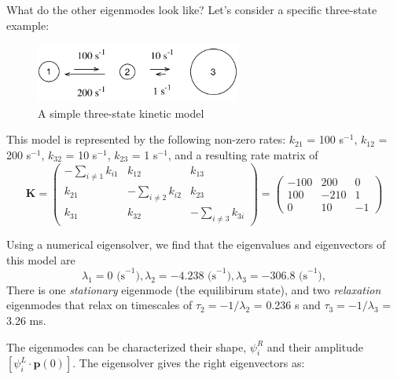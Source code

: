 \documentclass[11pt, oneside]{article}   	%
\begin{document}
What do the other eigenmodes look like?  Let's consider a specific three-state example:


\begin{figure}[htbp]
\begin{center}
\includegraphics[width=0.6\textwidth]{three-state}
\caption{\label{fig:three-state}A simple three-state kinetic model}
\end{center}
\end{figure}

This model is represented by the following non-zero rates: $k_{21}$ = 100 s$^{-1}$, $k_{12}$ = 200 s$^{-1}$, $k_{32}$ = 10 s$^{-1}$, $k_{23}$ = 1 s$^{-1}$, and a resulting rate matrix of 
\[
\mathbf{K} =
 \begin{pmatrix}
  -\sum_{i \neq 1} k_{i1} & k_{12} & k_{13} \\
  k_{21} & -\sum_{i \neq 2}k_{i2} & k_{23} \\
  k_{31} & k_{32} & -\sum_{i \neq 3}k_{3i}
 \end{pmatrix} =    \begin{pmatrix}
  -100 & 200 & 0 \\
 100 & -210 & 1 \\
  0 & 10 & -1
 \end{pmatrix}\]

Using a numerical eigensolver, we find that the eigenvalues and eigenvectors of this model are
\[
\lambda_1 = 0 \text{ (s}^{-1}),  \lambda_2 = -4.238 \text{ (s}^{-1}),  \lambda_3 = -306.8 \text{ (s}^{-1}),  
\]
There is one \textit{stationary} eigenmode (the equilibirum state), and two \textit{relaxation} eigenmodes that relax on timescales of $\tau_2 = -1/\lambda_2$ = 0.236 s and $\tau_3 = -1/\lambda_3$ = 3.26 ms.

The eigenmodes can be characterized their shape, $\psi_i^R$ and their amplitude $[\psi^L_i \cdot  \mathbf{p}(0)]$.   The eigensolver gives the right eigenvectors as:
\end{document}
